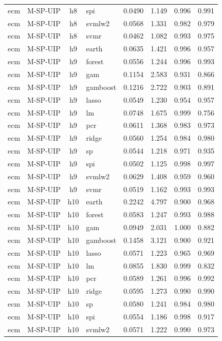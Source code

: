 \begin{ThreePartTable}
\begin{longtable}[t]{llclcccc}
ecm & M-SP-UIP & h8 & spi & 0.0490 & 1.149 & 0.996 & 0.991\\
ecm & M-SP-UIP & h8 & svmlw2 & 0.0568 & 1.331 & 0.982 & 0.979\\
ecm & M-SP-UIP & h8 & svmr & 0.0462 & 1.082 & 0.993 & 0.975\\
\addlinespace
ecm & M-SP-UIP & h9 & earth & 0.0635 & 1.421 & 0.996 & 0.957\\
ecm & M-SP-UIP & h9 & forest & 0.0556 & 1.244 & 0.996 & 0.993\\
ecm & M-SP-UIP & h9 & gam & 0.1154 & 2.583 & 0.931 & 0.866\\
ecm & M-SP-UIP & h9 & gamboost & 0.1216 & 2.722 & 0.903 & 0.891\\
ecm & M-SP-UIP & h9 & lasso & 0.0549 & 1.230 & 0.954 & 0.957\\
ecm & M-SP-UIP & h9 & lm & 0.0748 & 1.675 & 0.999 & 0.756\\
ecm & M-SP-UIP & h9 & pcr & 0.0611 & 1.368 & 0.983 & 0.973\\
ecm & M-SP-UIP & h9 & ridge & 0.0560 & 1.254 & 0.984 & 0.980\\
ecm & M-SP-UIP & h9 & sp & 0.0544 & 1.218 & 0.971 & 0.935\\
ecm & M-SP-UIP & h9 & spi & 0.0502 & 1.125 & 0.998 & 0.997\\
ecm & M-SP-UIP & h9 & svmlw2 & 0.0629 & 1.408 & 0.959 & 0.960\\
ecm & M-SP-UIP & h9 & svmr & 0.0519 & 1.162 & 0.993 & 0.993\\
\addlinespace
ecm & M-SP-UIP & h10 & earth & 0.2242 & 4.797 & 0.900 & 0.968\\
ecm & M-SP-UIP & h10 & forest & 0.0583 & 1.247 & 0.993 & 0.988\\
ecm & M-SP-UIP & h10 & gam & 0.0949 & 2.031 & 1.000 & 0.882\\
ecm & M-SP-UIP & h10 & gamboost & 0.1458 & 3.121 & 0.900 & 0.921\\
ecm & M-SP-UIP & h10 & lasso & 0.0571 & 1.223 & 0.965 & 0.969\\
ecm & M-SP-UIP & h10 & lm & 0.0855 & 1.830 & 0.999 & 0.832\\
ecm & M-SP-UIP & h10 & pcr & 0.0589 & 1.261 & 0.996 & 0.992\\
ecm & M-SP-UIP & h10 & ridge & 0.0595 & 1.273 & 0.990 & 0.990\\
ecm & M-SP-UIP & h10 & sp & 0.0580 & 1.241 & 0.984 & 0.980\\
ecm & M-SP-UIP & h10 & spi & 0.0554 & 1.186 & 0.998 & 0.917\\
ecm & M-SP-UIP & h10 & svmlw2 & 0.0571 & 1.222 & 0.990 & 0.973\\

\end{longtable}
\end{ThreePartTable}
